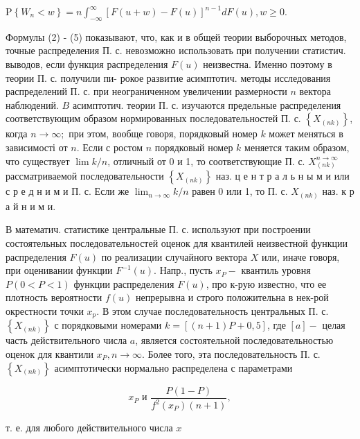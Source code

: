 \documentclass[10pt]{article}
\begin{document}
$\mathrm{P}\left\{W_{n}<w\right\}=n \int_{-\infty}^{\infty}[F(u+w)-F(u)]^{n-1} d F(u), w \geqslant 0$.



Формулы (2) - (5) показывают, что, как и в общей теории выборочных методов, точные распределения П. с. невозможно использовать при получении статистич. выводов, если функция распределения $F(u)$ неизвестна. Именно поэтому в теории П. с. получили пи- рокое развитие асимптотич. методы исследования распределений П. с. при неограниченном увеличении размерности $n$ вектора наблюдений. $B$ асимптотич. теории П. с. изучаются предельные распределения соответствующим образом нормированных последовательностей П. с. $\left\{X_{(n k)}\right\}$, когда $n \rightarrow \infty ;$ при этом, вообще говоря, порядковый номер $k$ может меняться в зависимості от $n$. Если с ростом $n$ порядковый номер $k$ меняется таким образом, что существует $\lim k / n$, отличный от 0 и 1, то соответствующие П. с. $X_{(n k)}^{n \rightarrow \infty}$ рассматриваемой последовательности $\left\{X_{(n k)}\right\}$ наз. ц е н т р а л ь н ы м и или с р е д н и м и П. с. Если же $\lim _{n \rightarrow \infty} k / n$ равен 0 или 1, то П. с. $X_{(n k)}$ наз. к р а й н и м и.



В математич. статистике центральные П. с. используют при построении состоятельных последовательностей оценок для квантилей неизвестной функции распределения $F(u)$ по реализации случайного вектора $X$ или, иначе говоря, при оценивании функции $F^{-1}(u)$. Напр., пусть $x_{P}-$ квантиль уровня $P(0<P<1)$ функции распределения $F(u)$, про к-рую известно, что ее плотность вероятности $f(u)$ непрерывна и строго положительна в нек-рой окрестности точки $x_{p}$. В этом случае последовательность центральных П. с. $\left\{X_{(n k)}\right\}$ с порядковыми номерами $k=[(n+1) P+0,5]$, где $[a]-$ целая часть действительного числа $a$, является состоятельной последовательностью оценок для квантили $x_{P}, n \rightarrow \infty$. Более того, эта последовательность П. с. $\left\{X_{(n k)}\right\}$ асимптотически нормально распределена с параметрами



\[

x_{P} \text { и } \frac{P(1-P)}{f^{2}\left(x_{P}\right)(n+1)},

\]



т. е. для любого действительного числа $x$
\end{document}
